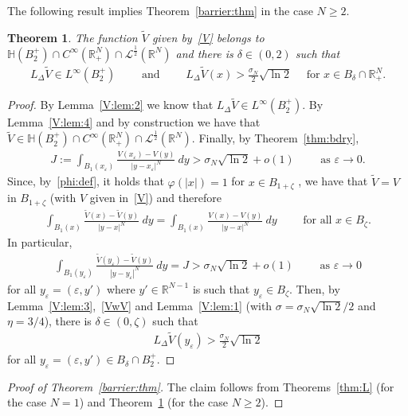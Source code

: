 \documentclass[11pt]{article}
\newcommand{\eps}{{\varepsilon}}
\newcommand{\R}{\mathbb{R}}
\numberwithin{equation}{section}
\newtheorem{theorem}{Theorem}[section]
\newcommand{\cL}{{\mathcal L}}
\begin{document}
The following result implies Theorem~\ref{barrier:thm} in the case $N\geq 2$.

\begin{theorem}\label{thm:log:N} The function $\widetilde V$ given by~\eqref{V} belongs to ${\mathbb H}(B_2^+)\cap C^\infty(\R^N_+)\cap\cL^{\frac{1}{2}}(\R^N)$ and there is $\delta\in(0,2)$ such that
\begin{align*}
L_\Delta \widetilde V\in L^\infty(B_2^+)\qquad \text{ and }\qquad L_\Delta \widetilde V(x)>\frac{\sigma_N}{2}\sqrt{\ln 2}\quad \text { for }x\in B_\delta\cap\R^N_+.
\end{align*}
\end{theorem}
\begin{proof}
By Lemma~\ref{V:lem:2} we know that $L_\Delta \widetilde V\in L^\infty(B_2^+)$.  By Lemma~\ref{V:lem:4} and by construction we have that $\widetilde V \in {\mathbb H}(B_2^+)\cap C^\infty(\R^N_+)\cap \cL^{\frac{1}{2}}(\R^N)$. Finally, by Theorem~\ref{thm:bdry},
\begin{align*}
J:=\int_{B_1(x_\eps)} \frac{V(x_\eps)-V(y)}{|y-x_\eps|^N}\ dy>\sigma_N \sqrt{\ln 2}+o(1)\qquad \text{ as }\eps\to 0.
\end{align*}
Since, by~\eqref{phi:def}, it holds that $\varphi(|x|)=1$ for $x\in B_{1+\zeta}$ , we have that
$\widetilde V=V$ in $B_{1+\zeta}$ (with $V$ given in~\eqref{V}) and therefore
\begin{align*}
\int_{B_1(x)} \frac{\widetilde V(x)- \widetilde V(y)}{|y-x|^N}\ dy
=\int_{B_1(x)} \frac{V(x)-V(y)}{|y-x|^N}\ dy\qquad \text{ for all }x\in B_\zeta.
\end{align*}
In particular,
\begin{align}\label{VwV}
\int_{B_1(y_\eps)} \frac{\widetilde V(y_\eps)- \widetilde V(y)}{|y-y_\eps|^N}\ dy
=J>\sigma_N \sqrt{\ln 2}+o(1)\qquad \text{ as }\eps\to 0
\end{align}
for all $y_\eps=(\eps,y')$ where $y'\in\R^{N-1}$ is such that $y_\eps\in B_\zeta$. Then, by Lemma~\ref{V:lem:3},~\eqref{VwV} and Lemma~\ref{V:lem:1} (with $\sigma = \sigma_N\sqrt{\ln 2}/2$ and $\eta=3/4$), there is $\delta\in(0,\zeta)$ such that 
\begin{align*}
L_\Delta \widetilde V(y_\eps)>\frac{\sigma_N}{2}\sqrt{\ln 2}
\end{align*}
for all $y_\eps=(\eps,y')\in B_\delta\cap B_2^+$.
\end{proof}




\begin{proof}[Proof of Theorem~\ref{barrier:thm}] The claim follows from Theorems~\ref{thm:L} (for the case $N=1$) and Theorem~\ref{thm:log:N} (for the case $N\geq 2$).
\end{proof}
\end{document}
